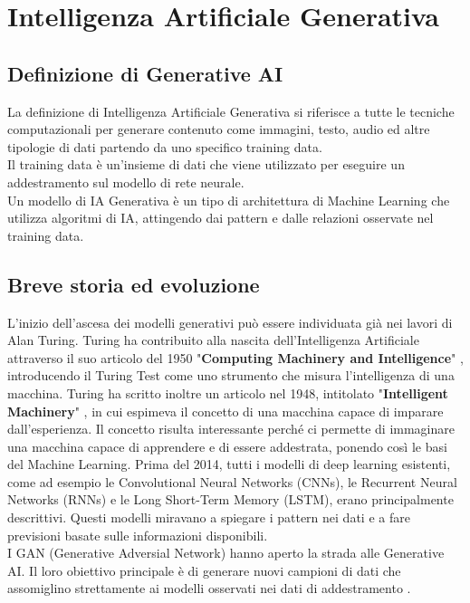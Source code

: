 \chapter{Intelligenza Artificiale Generativa}\label{chapter:AI-generativa}

\section{Definizione di Generative AI}
La definizione di Intelligenza Artificiale Generativa si riferisce a tutte le tecniche computazionali per generare contenuto come immagini, testo, audio ed altre tipologie di dati partendo da uno specifico training data\cite{feuerriegel2024generative}.\\
Il training data è un'insieme di dati che viene utilizzato per eseguire un addestramento sul modello di rete neurale.\\
Un modello di IA Generativa è un tipo di architettura di Machine Learning che utilizza algoritmi di IA, attingendo dai pattern e dalle relazioni osservate nel training data\cite{feuerriegel2024generative}.

\section{Breve storia ed evoluzione}
L'inizio dell'ascesa dei modelli generativi può essere individuata già nei lavori di Alan Turing. Turing ha contribuito alla nascita dell'Intelligenza Artificiale attraverso il suo articolo del 1950 "\textbf{Computing Machinery and Intelligence}" \cite{turing2009computing}, introducendo il Turing Test come uno strumento che misura l'intelligenza di una macchina.
Turing ha scritto inoltre un articolo nel 1948, intitolato "\textbf{Intelligent Machinery}" \cite{turing2004intelligent} , in cui espimeva il concetto di una macchina capace di imparare dall'esperienza.
Il concetto risulta interessante perché ci permette di immaginare una macchina capace di apprendere e di essere addestrata, ponendo così le basi del Machine Learning.
Prima del 2014, tutti i modelli di deep learning esistenti, come ad esempio le Convolutional Neural Networks (CNNs)\cite{lecun1998gradient}, le Recurrent Neural Networks (RNNs)\cite{hopfield1985neural} e le Long Short-Term Memory (LSTM)\cite{hochreiter1997long}, erano principalmente descrittivi. Questi modelli miravano a spiegare i pattern nei dati e a fare previsioni basate sulle informazioni disponibili.\cite{bengesi2024advancements}\\
I GAN (Generative Adversial Network)\cite{goodfellow2020generative} hanno aperto la strada alle Generative AI. Il loro obiettivo principale è di generare nuovi campioni di dati che assomiglino strettamente ai modelli osservati nei dati di addestramento \cite{brophy2023generative}\cite{zhou2023emerging}.\\

